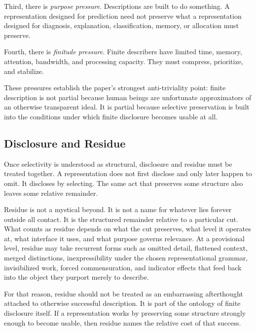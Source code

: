 \documentclass[11pt]{article}
\renewcommand{\emph}[1]{\textit{#1}}
\begin{document}
Third, there is \emph{purpose pressure}. Descriptions are built to do something. A representation designed for prediction need not preserve what a representation designed for diagnosis, explanation, classification, memory, or allocation must preserve. \cite{frigg_hartmann_models_sep}

Fourth, there is \emph{finitude pressure}. Finite describers have limited time, memory, attention, bandwidth, and processing capacity. They must compress, prioritize, and stabilize. \cite{adriaans_information_sep,arora_barak_complexity}

These pressures establish the paper's strongest anti-triviality point: finite description is not partial because human beings are unfortunate approximators of an otherwise transparent ideal. It is partial because selective preservation is built into the conditions under which finite disclosure becomes usable at all.

\subsection{Disclosure and Residue}

Once selectivity is understood as structural, disclosure and residue must be treated together. A representation does not first disclose and only later happen to omit. It discloses by selecting. The same act that preserves some structure also leaves some relative remainder.

Residue is not a mystical beyond. It is not a name for whatever lies forever outside all contact. It is the structured remainder relative to a particular cut. What counts as residue depends on what the cut preserves, what level it operates at, what interface it uses, and what purpose governs relevance. At a provisional level, residue may take recurrent forms such as omitted detail, flattened context, merged distinctions, inexpressibility under the chosen representational grammar, invisibilized work, forced commensuration, and indicator effects that feed back into the object they purport merely to describe. \cite{espeland_stevens_quantification,merry_seductions_of_quantification,porter_trust_in_numbers,star_ethnography_of_infrastructure,bowker_star_sorting_things_out}

For that reason, residue should not be treated as an embarrassing afterthought attached to otherwise successful description. It is part of the ontology of finite disclosure itself. If a representation works by preserving some structure strongly enough to become usable, then residue names the relative cost of that success.
\end{document}
